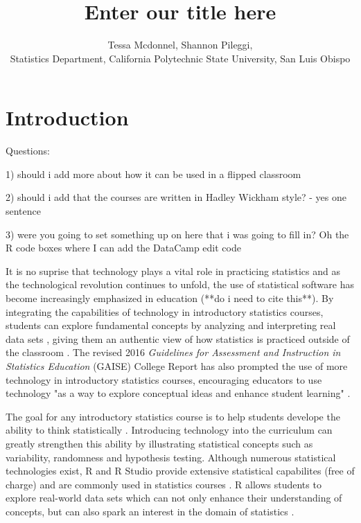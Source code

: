 \documentclass[12pt]{article}
\title{Enter our title here}
\author{Tessa Mcdonnel, Shannon Pileggi,  \\Statistics Department, California Polytechnic State University, San Luis Obispo}
\begin{document}
\maketitle

\section{Introduction}

\doublespacing

Questions: 

1) should i add more about how it can be used in a flipped classroom

2) should i add that the courses are written in Hadley Wickham style?
  - yes one sentence

3) were you going to set something up on here that i was going to fill in? Oh the R code boxes where I can add the DataCamp edit code

It is no suprise that technology plays a vital role in practicing statistics and as the technological revolution continues to
unfold, the use of statistical software has become increasingly emphasized in education (**do i need to cite this**). By integrating the
capabilities of technology in introductory statistics courses, students can explore fundamental concepts by analyzing and
interpreting real data sets \citep{Chance2007, Hardin2015, Horton2014}, giving them an authentic view of how statistics is practiced outside of the
classroom \citep{Wang2017}. The revised 2016 \textit{Guidelines for Assessment and Instruction in Statistics Education}
(GAISE) College Report has also prompted the use of more technology in introductory statistics courses, encouraging educators
to use technology "as a way to explore conceptual ideas and enhance student learning" \citep{AmericanStatisticalAssociation2016}.

The goal for any introductory statistics course is to help students develope the ability to think statistically
\cite{AmericanStatisticalAssociation2016}.
Introducing technology into the curriculum can greatly strengthen this ability by illustrating statistical concepts such as
variability, randomness and hypothesis testing. Although numerous statistical technologies exist, R and R Studio
provide extensive statistical capabilites (free of charge) and are commonly used in statistics courses \cite{Chance2007}. R
allows students to explore real-world data sets which can not only enhance their understanding of concepts, but can also spark
an interest in the domain of statistics \cite{Wang2017}.
\end{document}
